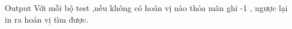 Output
Với mỗi bộ test ,nếu không có hoán vị nào thỏa mãn ghi -1 , ngược lại  in ra hoán vị tìm được.